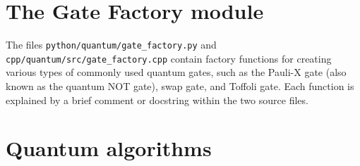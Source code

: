 \documentclass{article}
\begin{document}
\section{The Gate Factory module} 

The files \verb~python/quantum/gate_factory.py~ and \verb~cpp/quantum/src/gate_factory.cpp~ contain factory functions for creating various types of commonly used quantum gates, such as the Pauli-X gate (also known as the quantum NOT gate), swap gate, and Toffoli gate. Each function is explained by a brief comment or docstring within the two source files. 


\section{Quantum algorithms} 
\end{document}
